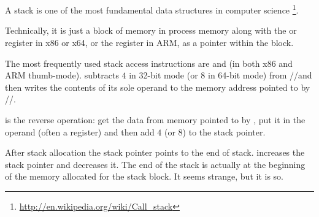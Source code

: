 \chapter{\Stack}
\label{sec:stack}
\index{\Stack}

{A stack is one of the most fundamental data structures in computer science}
\footnote{\url{http://en.wikipedia.org/wiki/Call_stack}}.

{Technically, it is just a block of memory in process memory along with the \ESP or \RSP register in x86 or x64, or the \SP register in ARM, as a pointer within the block.}

{The most frequently used stack access instructions are \PUSH and \POP (in both x86 and ARM thumb-mode). 
\PUSH subtracts $4$ in 32-bit mode (or $8$ in 64-bit mode) from \ESP/\RSP/\SP and then writes the contents of its sole operand to the memory address pointed to by \ESP/\RSP/\SP.} 

{\POP is the reverse operation: get the data from memory pointed to by \SP, 
put it in the operand (often a register) and then add $4$ (or $8$) to the \gls{stack pointer}.}

{After stack allocation the \gls{stack pointer} points to the end of stack.}
{\PUSH increases the \gls{stack pointer} and \POP decreases it.}
{The end of the stack is actually at the beginning of the memory allocated for the stack block. 
It seems strange, but it is so.}

